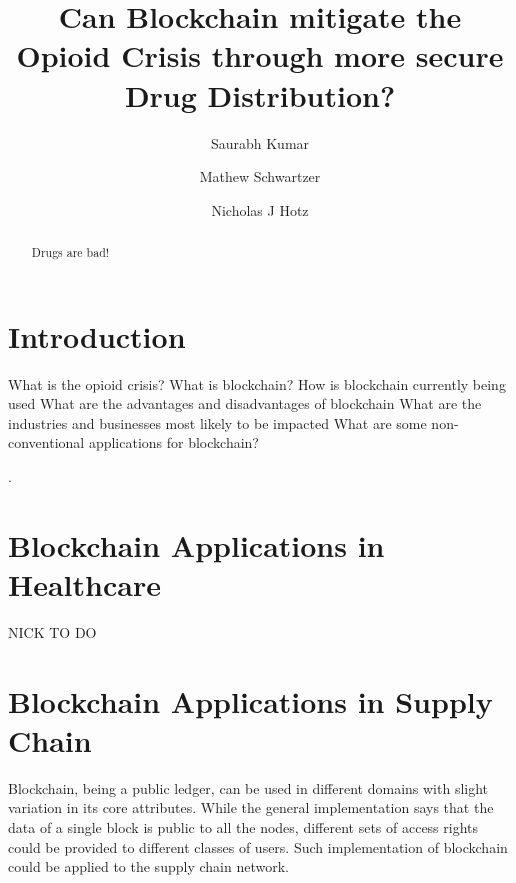 \documentclass[sigconf]{acmart}
\begin{document}
\title{Can Blockchain mitigate the Opioid Crisis through more secure Drug Distribution?}


\author{Saurabh Kumar}

\author{Mathew Schwartzer}

\author{Nicholas J Hotz}


\renewcommand{\shortauthors}{G. v. Laszewski}


\begin{abstract}
Drugs are bad!
\end{abstract}



\maketitle



\section{Introduction}
What is the opioid crisis?
What is blockchain?
How is blockchain currently being used
What are the advantages and disadvantages of blockchain
What are the industries and businesses most likely to be impacted
What are some non-conventional applications for blockchain?

 \cite{editor00}.

\section{Blockchain Applications in Healthcare}
NICK TO DO

\section{Blockchain Applications in Supply Chain}
Blockchain, being a public ledger, can be used in different domains with slight variation in its core attributes. While the general implementation says that the data of a single block is public to all the nodes, different sets of access rights could be provided to different classes of users.  Such implementation of blockchain could be applied to the supply chain network. 
\end{document}
